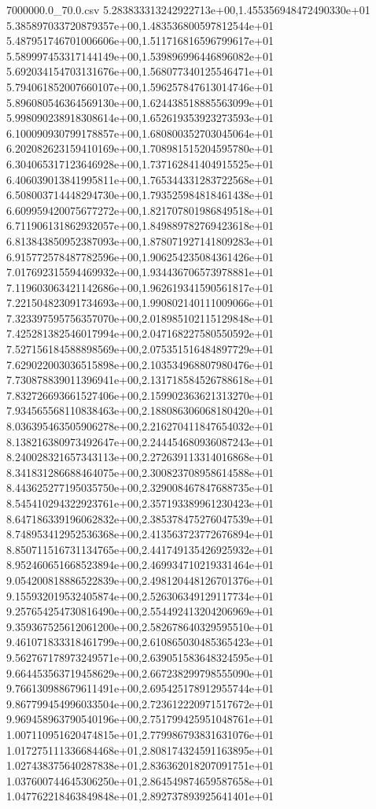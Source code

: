 \begin{filecontents*}{7000000.0_70.0.csv}
5.283833313242922713e+00,1.455356948472490330e+01
5.385897033720879357e+00,1.483536800597812544e+01
5.487951746701006606e+00,1.511716816596799617e+01
5.589997453317144149e+00,1.539896996446896082e+01
5.692034154703131676e+00,1.568077340125546471e+01
5.794061852007660107e+00,1.596257847613014746e+01
5.896080546364569130e+00,1.624438518885563099e+01
5.998090238918308614e+00,1.652619353923273593e+01
6.100090930799178857e+00,1.680800352703045064e+01
6.202082623159410169e+00,1.708981515204595780e+01
6.304065317123646928e+00,1.737162841404915525e+01
6.406039013841995811e+00,1.765344331283722568e+01
6.508003714448294730e+00,1.793525984818461438e+01
6.609959420075677272e+00,1.821707801986849518e+01
6.711906131862932057e+00,1.849889782769423618e+01
6.813843850952387093e+00,1.878071927141809283e+01
6.915772578487782596e+00,1.906254235084361426e+01
7.017692315594469932e+00,1.934436706573978881e+01
7.119603063421142686e+00,1.962619341590561817e+01
7.221504823091734693e+00,1.990802140111009066e+01
7.323397595756357070e+00,2.018985102115129848e+01
7.425281382546017994e+00,2.047168227580550592e+01
7.527156184588898569e+00,2.075351516484897729e+01
7.629022003036515898e+00,2.103534968807980476e+01
7.730878839011396941e+00,2.131718584526788618e+01
7.832726693661527406e+00,2.159902363621313270e+01
7.934565568110838463e+00,2.188086306068180420e+01
8.036395463505906278e+00,2.216270411847654032e+01
8.138216380973492647e+00,2.244454680936087243e+01
8.240028321657343113e+00,2.272639113314016868e+01
8.341831286688464075e+00,2.300823708958614588e+01
8.443625277195035750e+00,2.329008467847688735e+01
8.545410294322923761e+00,2.357193389961230423e+01
8.647186339196062832e+00,2.385378475276047539e+01
8.748953412952536368e+00,2.413563723772676894e+01
8.850711516731134765e+00,2.441749135426925932e+01
8.952460651668523894e+00,2.469934710219331464e+01
9.054200818886522839e+00,2.498120448126701376e+01
9.155932019532405874e+00,2.526306349129117734e+01
9.257654254730816490e+00,2.554492413204206969e+01
9.359367525612061200e+00,2.582678640329595510e+01
9.461071833318461799e+00,2.610865030485365423e+01
9.562767178973249571e+00,2.639051583648324595e+01
9.664453563719458629e+00,2.667238299798555090e+01
9.766130988679611491e+00,2.695425178912955744e+01
9.867799454996033504e+00,2.723612220971517672e+01
9.969458963790540196e+00,2.751799425951048761e+01
1.007110951620474815e+01,2.779986793831631076e+01
1.017275111336684468e+01,2.808174324591163895e+01
1.027438375640287838e+01,2.836362018207091751e+01
1.037600744645306250e+01,2.864549874659587658e+01
1.047762218463849848e+01,2.892737893925641401e+01

\end{filecontents*}
